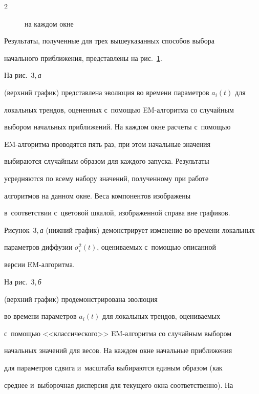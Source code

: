 \begin{multicols}{2}
\begin{figure}
{на каж\-дом окне


\label{fig3}}


\end{figure}





Результаты, полученные для трех вышеуказанных способов выбора


начального приближения, представлены на рис.~\ref{fig3}. 





На рис.~3,\,\textit{а}


(верхний график) представлена эволюция во времени параметров $a_i(t)$ для


локальных трендов, оцененных с~по\-мощью EM-ал\-го\-рит\-ма со случайным


выбором начальных приближений. На каждом окне расчеты с~помощью


EM-ал\-го\-рит\-ма проводятся пять раз, при этом начальные значения


выбираются случайным образом для каждого запуска. Результаты


усредняются по всему набору значений, полученному при работе


алгоритмов на данном окне. Веса компонентов изоб\-ра\-же\-ны 


в~соответствии с~цветовой шкалой, изоб\-ра\-жен\-ной справа вне графиков.


Рисунок~3,\,\textit{а} (нижний график) демонстрирует изменение во времени локальных


параметров диффузии $\sigma_i^2(t)$, оценива\-емых с~по\-мощью описанной


версии EM-ал\-го\-рит\-ма. 





На рис.~3,\,\textit{б}


(верхний график) продемонстрирована эволюция


во времени параметров $a_i(t)$ для локальных трендов, оценива\-емых 


с~по\-мощью <<классического>> EM-ал\-го\-рит\-ма со случайным выбором


начальных значений для весов. На каждом окне начальные приближения


для параметров сдвига и~масштаба выбираются единым образом (как


среднее и~выборочная дисперсия для текущего окна соответственно). На



\end{multicols}
